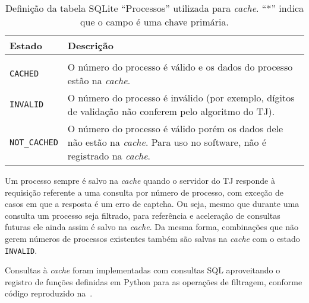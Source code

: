 \begin{table}[htb]
    \centering
    \begin{tabular}{lp{}}
        \toprule
        Estado & Descrição \\
        \midrule \\
        \texttt{CACHED} & O número do processo é válido e os dados do processo estão na \textit{cache}. \\
        \texttt{INVALID} & O número do processo é inválido (por exemplo, dígitos de validação não conferem pelo algoritmo do TJ). \\
        \texttt{NOT\_CACHED} & O número do processo é válido porém os dados dele não estão na \textit{cache}. Para uso no software, não é registrado na \textit{cache}. \\
        \bottomrule
    \end{tabular}
    \caption{%
        Definição da tabela SQLite ``Processos'' utilizada para \textit{cache}.
        ``*'' indica que o campo é uma chave primária.
    }
    \label{tbl:valores-coluna-state}
\end{table}


%

Um processo sempre é salvo na \textit{cache} quando o servidor do TJ responde à
requisição referente a uma consulta por número de processo, com exceção de
casos em que a resposta é um erro de captcha. Ou seja, mesmo que durante uma
consulta um processo seja filtrado, para referência e aceleração de consultas
futuras ele ainda assim é salvo na \textit{cache}. Da mesma forma, combinações
que não gerem números de processos existentes também são salvas na
\textit{cache} com o estado \texttt{INVALID}.

Consultas à \textit{cache} foram implementadas com consultas SQL aproveitando o
registro de funções definidas em Python para as operações de filtragem,
conforme código reproduzido na~.

